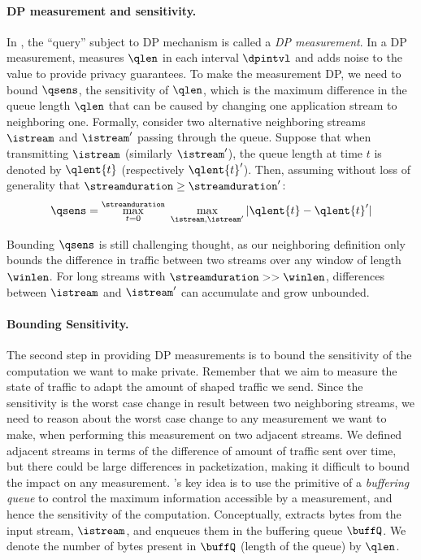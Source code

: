 \paragraph{DP measurement and sensitivity.}
In {\sys}, the ``query'' subject to DP mechanism is called a {\em DP
measurement}. In a DP measurement, {\sys} measures $\qlen$ in each interval
$\dpintvl$ and adds noise to the value to provide privacy guarantees.
To make the measurement DP, we need to bound
$\qsens$, the sensitivity of $\qlen$, which is the maximum difference in the
queue length $\qlen$ that can be caused by changing one application stream to
neighboring one.
Formally, consider two alternative neighboring streams $\istream$ and
$\istream'$ passing through the queue.
Suppose that when transmitting $\istream$ (similarly $\istream'$), the
queue length at time $t$ is denoted by $\qlent{t}$ (respectively $\qlent{t}'$).
Then, assuming without loss of generality that $\streamduration \geq
\streamduration'$:
\setlength{\abovedisplayskip}{0pt}
\begin{equation}
    \qsens = \max_{t = 0}^{\streamduration}~\max_{\istream,
        \istream'} | \qlent{t} - \qlent{t}' |
    \label{eqn:ssens}
\end{equation}

Bounding $\qsens$ is still challenging thought, as our neighboring definition
only bounds the difference in traffic between two streams over any window of
length $\winlen$.
For long streams with $\streamduration >> \winlen$, differences between
$\istream$ and $\istream'$ can accumulate and grow unbounded.

\paragraph{Bounding Sensitivity.}
The second step in providing DP measurements is to bound the sensitivity of the
computation we want to make private. Remember that we aim to measure the state
of traffic to adapt the amount of shaped traffic we send.
Since the sensitivity is the worst case change in result between two neighboring
streams, we need to reason about the worst case change to any measurement we want
to make, when performing this measurement on two adjacent streams.
We defined adjacent streams in terms of the difference of amount of traffic sent
over time, but there could be large differences in packetization, making it
difficult to bound the impact on any measurement.
%
\sys's key idea is to use the primitive of a {\em buffering queue} to control
the maximum information accessible by a measurement, and hence the sensitivity
of the computation.
Conceptually, {\sys} extracts bytes from the input stream, $\istream$, and
enqueues them in the buffering queue $\buffQ$.
We denote the number of bytes present in $\buffQ$ (\ie length of the queue) by
$\qlen$.

